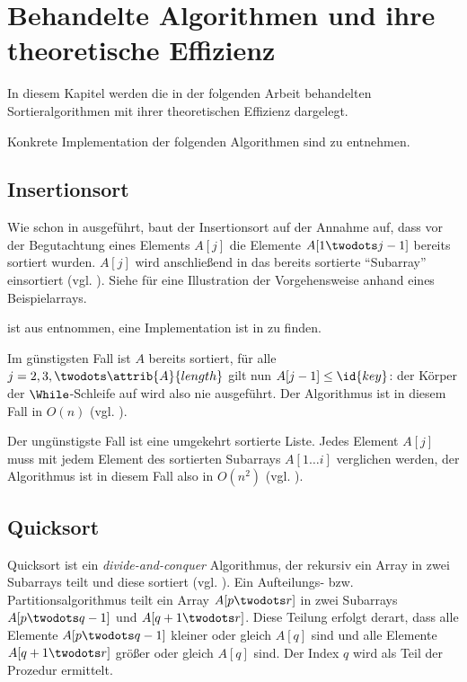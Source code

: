 \chapter{Behandelte Algorithmen und ihre theoretische Effizienz}
\label{cha:algorithmen}

In diesem Kapitel werden die in der folgenden Arbeit behandelten Sortieralgorithmen mit ihrer theoretischen Effizienz dargelegt.

Konkrete Implementation der folgenden Algorithmen sind  zu entnehmen.

\section{Insertionsort}
\label{sec:alg-insertion}

Wie schon in  ausgeführt, baut der Insertionsort auf der Annahme auf, dass vor der Begutachtung eines Elements $A[j]$ die Elemente $A[1 \twodots j - 1]$ bereits sortiert wurden. $A[j]$ wird anschließend in das bereits sortierte \enquote{Subarray} einsortiert (vgl. \cite[80]{taocp3}). Siehe  für eine Illustration der Vorgehensweise anhand eines Beispielarrays.





 ist aus \cite[18]{clrs2001} entnommen, eine Implementation ist in  zu finden.

Im günstigsten Fall ist $A$ bereits sortiert, für alle $j = 2, 3, \twodots \attrib{A}{length}$ gilt nun $A[j - 1] \leq \id{key}$: der Körper der $\While$-Schleife auf  wird also nie ausgeführt. Der Algorithmus ist in diesem Fall in $O(n)$ (vgl. \cite[28]{clrs2001}).

Der ungünstigste Fall ist eine umgekehrt sortierte Liste. Jedes Element $A[j]$ muss mit jedem Element des sortierten Subarrays $A[1 \ldots i]$ verglichen werden, der Algorithmus ist in diesem Fall also in $O(n^2)$ (vgl. \cite[28f]{clrs2001}).

\section{Quicksort}
\label{sec:alg-exchanging}

Quicksort ist ein \emph{divide-and-conquer} Algorithmus, der rekursiv ein Array in zwei Subarrays teilt und diese sortiert (vgl. \cite[113f]{taocp3}). Ein Aufteilungs- bzw. Partitionsalgorithmus teilt ein Array $A[p \twodots r]$ in zwei Subarrays $A[p \twodots q-1]$ und $A[q + 1 \twodots r]$. Diese Teilung erfolgt derart, dass alle Elemente $A[p \twodots q-1]$ kleiner oder gleich $A[q]$ sind und alle Elemente $A[q+1 \twodots r]$ größer oder gleich $A[q]$ sind. Der Index $q$ wird als Teil der Prozedur ermittelt.

